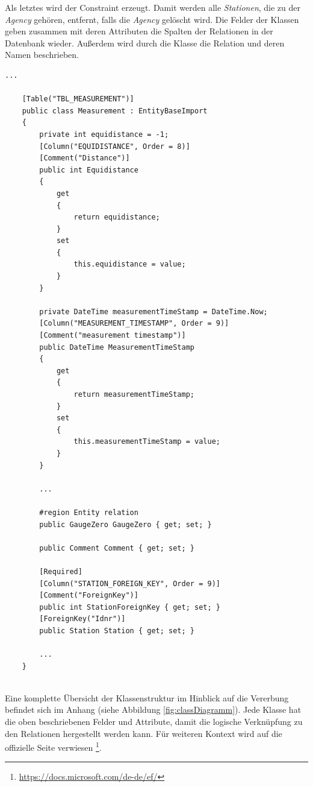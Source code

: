 Als letztes wird der Constraint erzeugt. Damit werden alle \textit{Stationen}, die zu der \textit{Agency} gehören, entfernt, falls die \textit{Agency} gelöscht wird.
Die Felder der Klassen geben zusammen mit deren Attributen die Spalten der Relationen in der Datenbank wieder.
Außerdem wird durch die Klasse die Relation und deren Namen beschrieben.
~\\
\begin{lstlisting}[language={[Sharp]C}, caption={Beispiel: Felder und Attribute einer Klasse}, captionpos=b, label={Script}]
    ...

    [Table("TBL_MEASUREMENT")]
    public class Measurement : EntityBaseImport
    {
        private int equidistance = -1;
        [Column("EQUIDISTANCE", Order = 8)]
        [Comment("Distance")]
        public int Equidistance
        {
            get
            {
                return equidistance;
            }
            set
            {
                this.equidistance = value;
            }
        }

        private DateTime measurementTimeStamp = DateTime.Now;
        [Column("MEASUREMENT_TIMESTAMP", Order = 9)]
        [Comment("measurement timestamp")]
        public DateTime MeasurementTimeStamp
        {
            get
            {
                return measurementTimeStamp;
            }
            set
            {
                this.measurementTimeStamp = value;
            }
        }

        ...

        #region Entity relation
        public GaugeZero GaugeZero { get; set; }

        public Comment Comment { get; set; }

        [Required]
        [Column("STATION_FOREIGN_KEY", Order = 9)]
        [Comment("ForeignKey")]
        public int StationForeignKey { get; set; }
        [ForeignKey("Idnr")]
        public Station Station { get; set; }

        ...
    }
\end{lstlisting}~\\
Eine komplette Übersicht der Klassenstruktur im Hinblick auf die Vererbung befindet sich im Anhang (siehe Abbildung \ref{fig:classDiagramm}). 
Jede Klasse hat die oben beschriebenen Felder und Attribute, damit die logische Verknüpfung zu den Relationen hergestellt werden kann.
Für weiteren Kontext wird auf die offizielle Seite verwiesen 
\footnote{\href{https://docs.microsoft.com/de-de/ef/}{https://docs.microsoft.com/de-de/ef/}}.

